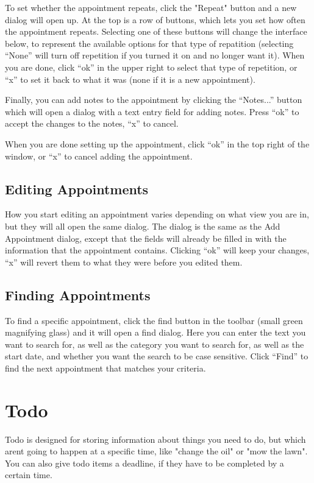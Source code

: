 \documentclass[12pt,letterpaper,oneside, openany]{book} \usepackage[latin1] {inputenc}
\begin{document}
To set whether the appointment repeats, click the "Repeat" button and a new dialog will open up. At the top is a row of buttons, which lets you set how often the appointment repeats. Selecting one of these buttons will change the interface below, to represent the available options for that type of repatition (selecting ``None'' will turn off repetition if you turned it on and no longer want it). When you are done, click ``ok'' in the upper right to select that type of repetition, or ``x'' to set it back to what it was (none if it is a new appointment). 

Finally, you can add notes to the appointment by clicking the ``Notes...'' button which will open a dialog with a text entry field for adding notes. Press ``ok'' to accept the changes to the notes, ``x'' to cancel. 

When you are done setting up the appointment, click ``ok'' in the top right of the window, or ``x'' to cancel adding the appointment. 


\section{Editing Appointments}

How you start editing an appointment varies depending on what view you are in, but they will all open the same dialog. The dialog is the same as the Add Appointment dialog, except that the fields will already be filled in with the information that the appointment contains. Clicking ``ok'' will keep your changes, ``x'' will revert them to what they were before you edited them. 


\section{Finding Appointments}

To find a specific appointment, click the find button in the toolbar (small green magnifying glass) and it will open a find dialog. Here you can enter the text you want to search for, as well as the category you want to search for, as well as the start date, and whether you want the search to be case sensitive. Click ``Find'' to find the next appointment that matches your criteria.

\chapter{Todo}
Todo is designed for storing information about things you need to do, but which arent going to happen at a specific time, like "change the oil" or "mow the lawn". You can also give todo items a deadline, if they have to be completed by a certain time. 
\end{document}
